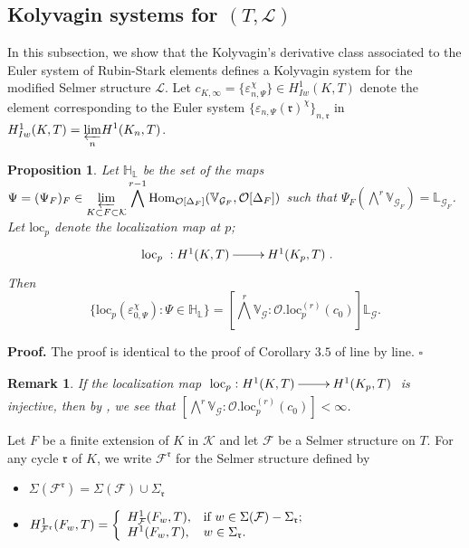 \documentclass[reqno]{amsart}
\newcounter{dummy} \numberwithin{dummy}{section}
\newtheorem{pro}[dummy]{Proposition}
\newtheorem{rem}[dummy]{Remark}
\begin{document}
\subsection{\bf Kolyvagin systems for $(T,\mathcal{L})$} In this
subsection, we show that the Kolyvagin's derivative class associated
to the Euler system of Rubin-Stark elements defines a Kolyvagin
system for the modified Selmer structure $\mathcal{L}$.\vskip 6pt
 Let $c_{K,\infty}=\{\varepsilon_{n,\Psi}^{\chi}\}\in
 H^{1}_{Iw}(K,T)$ denote the element corresponding to the Euler
 system
 $\{\varepsilon_{n,\Psi}(\mathfrak{r})^{\chi}\}_{n,\mathfrak{r}}$ in
 $H^{1}_{Iw}(K,T)=\displaystyle{\varprojlim_{n}}H^{1}(K_{n},T)$.
\begin{pro}\label{Proposition of locp}
Let $\mathbb{H}_{\mathbb{L}}$ be the set of the maps
$\Psi=(\Psi_{F})_{F}\in \displaystyle{\varprojlim_{K\subset F\subset
\mathcal{K}}}\bigwedge^{r-1}\mathrm{Hom}_{\mathcal{O}[\Delta_{F}]}(\mathbb{V}_{\mathcal{G}_{F}},
\mathcal{O}[\Delta_{F}])$ such that $
\Psi_{F}(\bigwedge^{r}\mathbb{V}_{\mathcal{G}_{F}})=\mathbb{L}_{\mathcal{G}_{F}}$.
Let $\mathrm{loc}_{p}$ denote the localization map at $p$;
$$
\xymatrix@=2pc{\mathrm{loc}_{p}\;: H^{1}(K,T)\ar[r]&H^{1}(K_{p},T)}.
$$
Then
$$
\{\mathrm{loc}_{p}(\varepsilon_{0,\Psi}^{\chi}): \Psi\in
\mathbb{H}_{\mathbb{L}} \}=
[\bigwedge^{r}\mathbb{V}_{\mathcal{G}}:\mathcal{O}.\mathrm{loc}^{(r)}_{p}(c_{0})]\mathbb{L}_{\mathcal{G}}.
$$
\end{pro}
\noindent \textbf{Proof.} The proof is identical to the proof of
Corollary $3.5$ of \cite{Kazim108} line by line. \hfill
$\square$\vskip 6pt
\begin{rem}\label{remark indice fini} If the localization map
$\xymatrix@=2pc{\mathrm{loc}_{p} : H^{1}(K,T)\ar[r]&
H^{1}(K_{p},T)}$ is injective, then by \cite[Proposition 6.6
(ii)]{Rubin96}, we see that
$[\bigwedge^{r}\mathbb{V}_{\mathcal{G}}:\mathcal{O}.\mathrm{loc}^{(r)}_{p}(c_{0})]<\infty$.
\end{rem}
 Let $F$ be a finite extension of $K$ in $\mathcal{K}$ and
let $\mathcal{F}$ be a Selmer structure on $T$. For any cycle
$\mathfrak{r}$ of $K$, we write $\mathcal{F}^{\mathfrak{r}}$ for the
Selmer structure defined by
\begin{itemize}
    \item
$\Sigma(\mathcal{F}^{\mathfrak{r}})=\Sigma(\mathcal{F})\cup
\Sigma_{\mathfrak{r}}$
    \item $H^{1}_{\mathcal{F}^{\mathfrak{r}}}(F_{w},T)= \left\{
            \begin{array}{ll}
            H^{1}_{\mathcal{F}}(F_{w},T)  , & \hbox{if $w\in \Sigma(\mathcal{F})-\Sigma_{\mathfrak{r}}$;} \\
             H^{1}(F_{w},T) , & \hbox{$w\in\Sigma_{\mathfrak{r}}$.}
            \end{array}
          \right.
$
\end{itemize}
\end{document}
